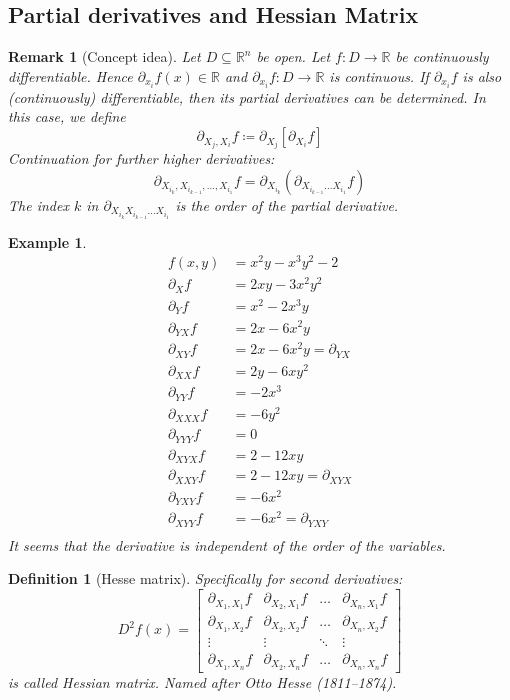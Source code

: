 \documentclass{article}
\newtheorem{example}{Example}  \numberwithin{example}{section}
\newtheorem{definition}{Definition}  \numberwithin{definition}{section}
\newtheorem{remark}{Remark}  \numberwithin{remark}{section}
\begin{document}
\subsection{Partial derivatives and Hessian Matrix}

\begin{remark}[Concept idea]
  Let $D \subseteq \mathbb R^n$ be open. Let $f: D \to \mathbb  R$ be continuously differentiable.
  Hence $\partial_{x_i} f(x) \in \mathbb R$ and $\partial_{x_i} f: D \to \mathbb R$ is continuous.
  If $\partial_{x_i} f$ is also (continuously) differentiable, then its partial derivatives can be determined.
  In this case, we define
  \[ \partial_{X_j, X_i} f \coloneqq \partial_{X_j} [\partial_{X_i} f] \]
  Continuation for further higher derivatives:
  \[ \partial_{X_{i_k}, X_{i_{k-1}}, \dots, X_{i_1}} f = \partial_{X_{i_k}} (\partial_{X_{i_{k-1}} \dots X_{i_1}} f) \]
  The index $k$ in $\partial_{X_{i_k} X_{i_{k-1}} \dots X_{i_1}}$ is the \emph{order of the partial derivative}.
\end{remark}

\begin{example}
  \begin{align*}
    f(x, y) &= x^2 y - x^3 y^2 - 2 \\
    \partial_X f &= 2xy - 3x^2 y^2 \\
    \partial_Y f &= x^2 - 2x^3 y \\
    \partial_{YX} f &= 2x - 6x^2y \\
    \partial_{XY} f &= 2x - 6x^2y = \partial_{YX} \\
    \partial_{XX} f &= 2y - 6xy^2 \\
    \partial_{YY} f &= -2x^3 \\
    \partial_{XXX} f &= -6y^2 \\
    \partial_{YYY} f &= 0 \\
    \partial_{XYX} f &= 2 - 12xy \\
    \partial_{XXY} f &= 2 - 12xy = \partial_{XYX} \\
    \partial_{YXY} f &= -6x^2 \\
    \partial_{XYY} f &= -6x^2 = \partial_{YXY} \\
  \end{align*}
  It seems that the derivative is independent of the order of the variables.
\end{example}

\begin{definition}[Hesse matrix]
  Specifically for second derivatives:
  \[
    D^2 f(x) = \begin{bmatrix}
      \partial_{X_1,X_1} f & \partial_{X_2,X_1} f & \dots & \partial_{X_n,X_1} f \\
      \partial_{X_1,X_2} f & \partial_{X_2,X_2} f & \dots & \partial_{X_n,X_2} f \\
      \vdots & \vdots & \ddots & \vdots \\
      \partial_{X_1,X_n} f & \partial_{X_2,X_n} f & \dots & \partial_{X_n,X_n} f
    \end{bmatrix}
  \]
  is called \emph{Hessian matrix}. Named after Otto Hesse (1811--1874).
\end{definition}
\end{document}
